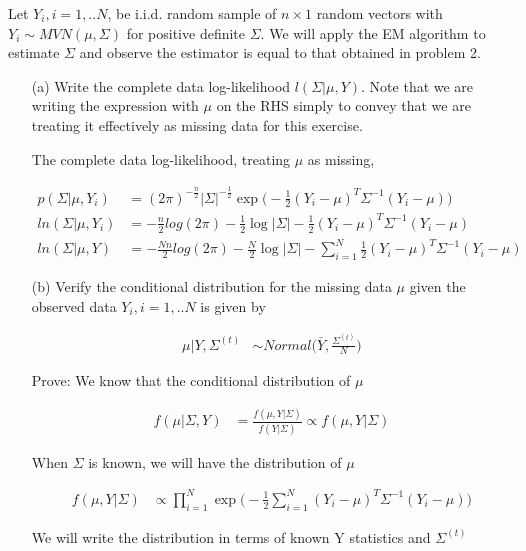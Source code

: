 Let $Y_i, i=1,..N$, be i.i.d. random sample of $n \times 1$ random vectors with $Y_i \sim MVN(\mu, \Sigma)$ for positive definite $\Sigma$. We will apply the EM algorithm to estimate $\Sigma$ and observe the estimator is equal to that obtained in problem 2. 

\begin{itemize}
\item[(a)] Write the complete data log-likelihood $l(\Sigma | \mu, Y)$. Note that we are writing the expression with $\mu$ on the RHS simply to convey that we are treating it effectively as missing data for this exercise.

The complete data log-likelihood, treating $\mu$ as missing,

\begin{align*}
p(\Sigma | \mu, Y_i) &= (2\pi)^{-\frac{n}{2}} \vert \Sigma \vert^{-\frac{1}{2}} \exp \Big( -\frac{1}{2} (Y_i - \mu)^T \Sigma^{-1} (Y_i - \mu) \Big) \\
ln(\Sigma | \mu, Y_i) & =-\frac{n}{2} log (2 \pi) - \frac{1}{2} \log  \vert \Sigma \vert - \frac{1}{2} (Y_i - \mu)^T \Sigma^{-1} (Y_i - \mu) \\
ln(\Sigma | \mu, Y) & =-\frac{Nn}{2} log (2 \pi) - \frac{N}{2} \log  \vert \Sigma \vert - \sum_{i=1}^N \frac{1}{2} (Y_i - \mu)^T \Sigma^{-1} (Y_i - \mu) 
\end{align*}

\item[(b)] Verify the conditional distribution for the missing data $\mu$ given the observed data $Y_i, i=1,..N$ is given by

\begin{align*}
\mu | Y, \Sigma^{(t)} & \sim Normal \Big( \bar{Y}, \frac{\Sigma^{(t)}}{N} \Big) 
\end{align*}

Prove: We know that the conditional distribution of $\mu$

\begin{align*}
f(\mu | \Sigma, Y) &= \frac{f(\mu, Y | \Sigma)}{f(Y| \Sigma)} \propto f(\mu, Y | \Sigma)
\end{align*}

When $\Sigma$ is known, we will have the distribution of $\mu$ 

\begin{align*}
f(\mu, Y | \Sigma) & \propto \prod_{i=1}^N \exp \Big( -\frac{1}{2} \sum_{i=1}^N (Y_i - \mu)^T \Sigma^{-1} (Y_i - \mu) \Big) 
\end{align*}

We will write the distribution in terms of known Y statistics and $\Sigma^{(t)}$ 


\end{itemize}
